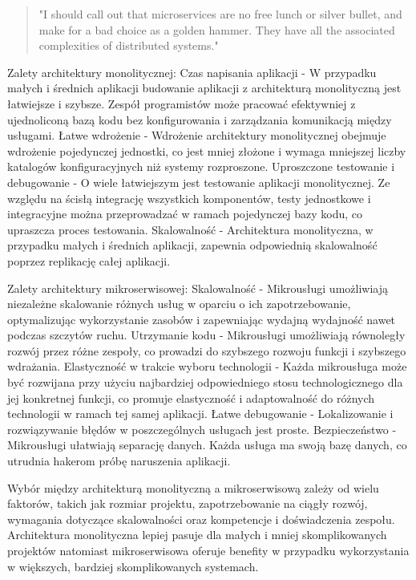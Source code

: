 \documentclass[runningheads,12pt]{llncs}
\begin{document}
\begin{quote}
    "I should call out that microservices are no free lunch or silver bullet, and make for a bad choice as a golden hammer. They have all the associated complexities of distributed systems."~\cite[p. 11]{newman2015building}
\end{quote}

Zalety architektury monolitycznej:
Czas napisania aplikacji - W przypadku małych i średnich aplikacji budowanie aplikacji z architekturą monolityczną jest łatwiejsze i szybsze. Zespół programistów może pracować efektywniej z ujednoliconą bazą kodu bez konfigurowania i zarządzania komunikacją między usługami.
Łatwe wdrożenie - Wdrożenie architektury monolitycznej obejmuje wdrożenie pojedynczej jednostki, co jest mniej złożone i wymaga mniejszej liczby katalogów konfiguracyjnych niż systemy rozproszone.
Uproszczone testowanie i debugowanie - O wiele łatwiejszym jest testowanie aplikacji monolitycznej. Ze względu na ścisłą integrację wszystkich komponentów, testy jednostkowe i integracyjne można przeprowadzać w ramach pojedynczej bazy kodu, co upraszcza proces testowania.
Skalowalność - Architektura monolityczna, w przypadku małych i średnich aplikacji, zapewnia odpowiednią skalowalność poprzez replikację całej aplikacji.~\cite{sharma2023monolithic}

Zalety architektury mikroserwisowej:
Skalowalność - Mikrousługi umożliwiają niezależne skalowanie różnych usług w oparciu o ich zapotrzebowanie, optymalizując wykorzystanie zasobów i zapewniając wydajną wydajność nawet podczas szczytów ruchu.
Utrzymanie kodu - Mikrousługi umożliwiają równoległy rozwój przez różne zespoły, co prowadzi do szybszego rozwoju funkcji i szybszego wdrażania.
Elastyczność w trakcie wyboru technologii - Każda mikrousługa może być rozwijana przy użyciu najbardziej odpowiedniego stosu technologicznego dla jej konkretnej funkcji, co promuje elastyczność i adaptowalność do różnych technologii w ramach tej samej aplikacji.
Łatwe debugowanie - Lokalizowanie i rozwiązywanie błędów w poszczególnych usługach jest proste.
Bezpieczeństwo - Mikrousługi ułatwiają separację danych. Każda usługa ma swoją bazę danych, co utrudnia hakerom próbę naruszenia aplikacji.~\cite{sharma2023monolithic}

Wybór między architekturą monolityczną a mikroserwisową zależy od wielu faktorów, takich jak rozmiar projektu, zapotrzebowanie na ciągły rozwój, wymagania dotyczące skalowalności oraz kompetencje i doświadczenia zespołu. Architektura monolityczna lepiej pasuje dla małych i mniej skomplikowanych projektów natomiast mikroserwisowa oferuje benefity w przypadku wykorzystania w większych, bardziej skomplikowanych systemach.
\end{document}
